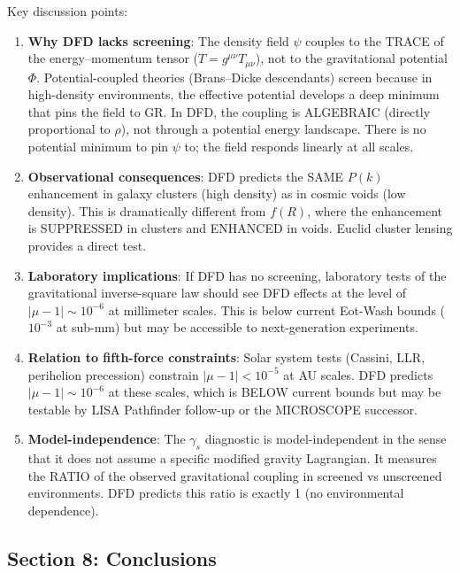 \documentclass[11pt,a4paper]{article}
\begin{document}
Key discussion points:
\begin{enumerate}
\item \textbf{Why DFD lacks screening}: The density field $\psi$ couples to the TRACE of the energy--momentum tensor ($T = g^{\mu\nu}T_{\mu\nu}$), not to the gravitational potential $\Phi$. Potential-coupled theories (Brans--Dicke descendants) screen because in high-density environments, the effective potential develops a deep minimum that pins the field to GR. In DFD, the coupling is ALGEBRAIC (directly proportional to $\rho$), not through a potential energy landscape. There is no potential minimum to pin $\psi$ to; the field responds linearly at all scales.

\item \textbf{Observational consequences}: DFD predicts the SAME $P(k)$ enhancement in galaxy clusters (high density) as in cosmic voids (low density). This is dramatically different from $f(R)$, where the enhancement is SUPPRESSED in clusters and ENHANCED in voids. Euclid cluster lensing provides a direct test.

\item \textbf{Laboratory implications}: If DFD has no screening, laboratory tests of the gravitational inverse-square law should see DFD effects at the level of $|\mu - 1| \sim 10^{-6}$ at millimeter scales. This is below current Eot-Wash bounds ($10^{-3}$ at sub-mm) but may be accessible to next-generation experiments.

\item \textbf{Relation to fifth-force constraints}: Solar system tests (Cassini, LLR, perihelion precession) constrain $|\mu - 1| < 10^{-5}$ at AU scales. DFD predicts $|\mu - 1| \sim 10^{-6}$ at these scales, which is BELOW current bounds but may be testable by LISA Pathfinder follow-up or the MICROSCOPE successor.

\item \textbf{Model-independence}: The $\gamma_s$ diagnostic is model-independent in the sense that it does not assume a specific modified gravity Lagrangian. It measures the RATIO of the observed gravitational coupling in screened vs unscreened environments. DFD predicts this ratio is exactly 1 (no environmental dependence).
\end{enumerate}

\subsection{Section 8: Conclusions}
\end{document}
